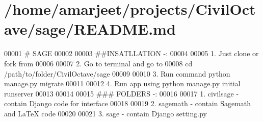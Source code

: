 \hypertarget{sage_2README_8md_source}{}\section{/home/amarjeet/projects/\+Civil\+Octave/sage/\+R\+E\+A\+D\+M\+E.md}

\begin{DoxyCode}
00001 # SAGE
00002 
00003 ##INSATLLATION -:
00004 
00005 1. Just clone or fork from
00006 
00007 2. Go to terminal and go to
00008    cd  /path/to/folder/CivilOctave/sage
00009 
00010 3. Run command python manage.py migrate
00011 
00012 4. Run app using python manage.py initial runserver
00013 
00014 
00015 ### FOLDERS -:
00016 
00017 1. civilsage - contain Django code for interface
00018 
00019 2. sagemath - contain Sagemath and LaTeX code  
00020 
00021 3. sage - contain Django setting.py
\end{DoxyCode}
